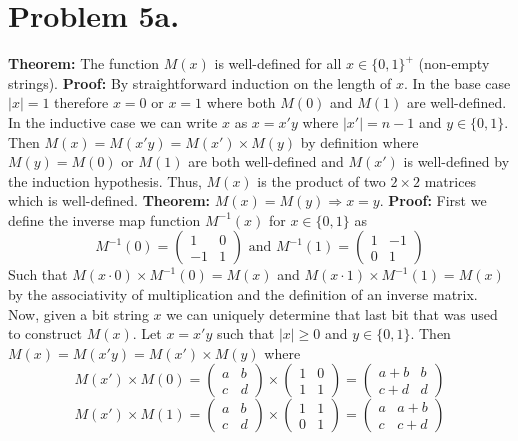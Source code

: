 \documentclass[12pt]{article}
\begin{document}
\section*{Problem 5a.}
\textbf{Theorem:} The function $M(x)$ is well-defined for all $x\in\{0,1\}^+$
(non-empty strings).
\newline
\textbf{Proof:} By straightforward induction on the length of $x$. In the base
case $|x| = 1$ therefore $x = 0$ or $x = 1$ where both $M(0)$ and $M(1)$ are
well-defined. In the inductive case we can write $x$ as $x = x'y$ where
$|x'| = n-1$ and $y\in \{0,1\}$. Then $M(x) = M(x'y) = M(x') \times M(y)$ by
definition where $M(y) = M(0) \text{ or } M(1)$ are both well-defined and
$M(x')$ is well-defined by the induction hypothesis. Thus, $M(x)$ is the product
of two $2 \times 2$ matrices which is well-defined.
\vspace{2mm}
\newline
\textbf{Theorem:} $M(x) = M(y) \Rightarrow x = y$.
\newline
\textbf{Proof:} First we define the inverse map function $M^{-1}(x)$ for
$x \in \{0,1\}$ as
$$M^{-1}(0) = \left(\begin{array}{cc} 1 & 0 \\ -1 & 1 \end{array}\right)
\text{ and } M^{-1}(1) = \left(\begin{array}{cc} 1 & -1 \\ 0 & 1 \end{array}\right)$$
Such that $M(x\cdot0)\times M^{-1}(0) = M(x)$ and $M(x\cdot1)\times M^{-1}(1) = M(x)$
by the associativity of multiplication and the definition of an inverse matrix.
Now, given a bit string $x$ we can uniquely determine that last bit that was used
to construct $M(x)$. Let $x = x'y$ such that $|x| \ge 0$ and $y\in\{0,1\}$. Then
$M(x) = M(x'y) = M(x') \times M(y)$ where 
$$M(x') \times M(0) =
\left(\begin{array}{cc} a & b \\ c & d \end{array}\right) \times
\left(\begin{array}{cc} 1 & 0 \\ 1 & 1 \end{array}\right) =
\left(\begin{array}{cc} a+b & b \\ c+d & d \end{array}\right)$$
$$M(x') \times M(1) =
\left(\begin{array}{cc} a & b \\ c & d \end{array}\right) \times
\left(\begin{array}{cc} 1 & 1 \\ 0 & 1 \end{array}\right) =
\left(\begin{array}{cc} a & a+b \\ c & c+d \end{array}\right)$$
\end{document}

